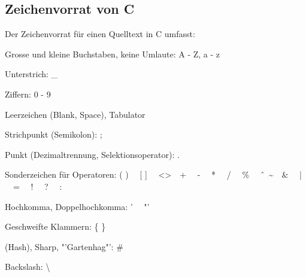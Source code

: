  	\subsection{Zeichenvorrat von C }
 		Der Zeichenvorrat für einen Quelltext in C umfasst: \\
 		\begin{minipage}[c]{9 cm}
 			\begin{compactitem}
 				\item Grosse und kleine Buchstaben, keine Umlaute: A - Z, a - z 
 				\item Unterstrich: \_
 				\item Ziffern: 0 - 9
 				\item Leerzeichen (Blank, Space), Tabulator
 				\item Strichpunkt (Semikolon): ;	
 			\end{compactitem}  				
 		\end{minipage}
 		\hspace*{0.5cm}
 		\begin{minipage}[c]{9 cm}
			\begin{compactitem}
 				\item Punkt (Dezimaltrennung, Selektionsoperator): .
 				\item Sonderzeichen für Operatoren: ( ) \ \ [ ] \ \ \textless  	\textgreater \ \  + \ \ - \ \ * \ \ / \ \ \% \ \ \^ \ \ \textasciitilde \ \ \& \ \ | \ \ = \ \ ! \ \ ? \ \ :
 				\item Hochkomma, Doppelhochkomma: ' \ \ "'
 				\item Geschweifte Klammern: \{ \}
 				\item (Hash), Sharp, "'Gartenhag"': \#
 				\item Backslash: \textbackslash 	
 			\end{compactitem} 
 		\end{minipage}


